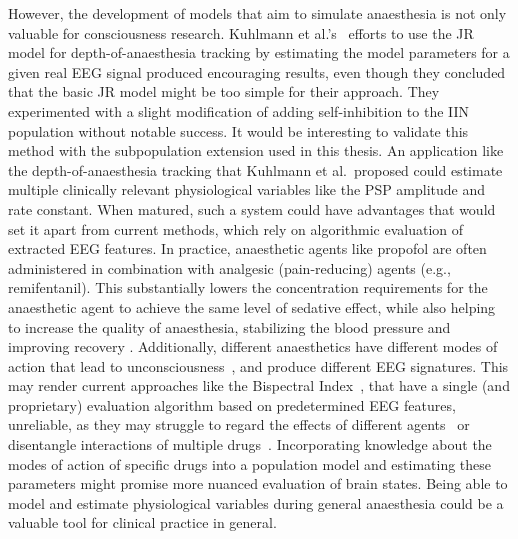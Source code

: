 However, the development of models that aim to simulate anaesthesia is not only valuable for consciousness research.
Kuhlmann et al.'s~\cite{kuhlmann_neural_2016} efforts to use the JR model for depth-of-anaesthesia tracking
by estimating the model parameters for a given real EEG signal produced encouraging results,
even though they concluded that the basic JR model might be too simple for their approach.
They experimented with a slight modification of adding self-inhibition to the IIN population without notable success.
It would be interesting to validate this method with the subpopulation extension used in this thesis.
An application like the depth-of-anaesthesia tracking that Kuhlmann et al.\ proposed
could estimate multiple clinically relevant physiological variables like the PSP amplitude and rate constant.
When matured, such a system could have advantages that would set it apart from current methods,
which rely on algorithmic evaluation of extracted EEG features.
In practice, anaesthetic agents like propofol are often administered in combination with analgesic (pain-reducing)
agents (e.g., remifentanil).
This substantially lowers the concentration requirements for the anaesthetic agent to achieve the same level of
sedative effect,
while also helping to increase the quality of anaesthesia, stabilizing the blood pressure and improving recovery
\citationneeded.
Additionally, different anaesthetics have different modes of action that
lead to unconsciousness~\cite{tantirigama_perspective_2020},
and produce different EEG signatures.
This may render current approaches like the Bispectral Index~\cite{mathur_bispectral_2022},
that have a single (and proprietary) evaluation algorithm based on predetermined EEG features,
unreliable, as they may struggle to regard the effects of different agents~\cite{avidan_prevention_2011}
or disentangle interactions of multiple drugs~\cite{kuhlmann_neural_2016}.
Incorporating knowledge about the modes of action of specific drugs into a population model
and estimating these parameters might promise more nuanced evaluation of brain states.
Being able to model and estimate physiological variables during general anaesthesia
could be a valuable tool for clinical practice in general.

